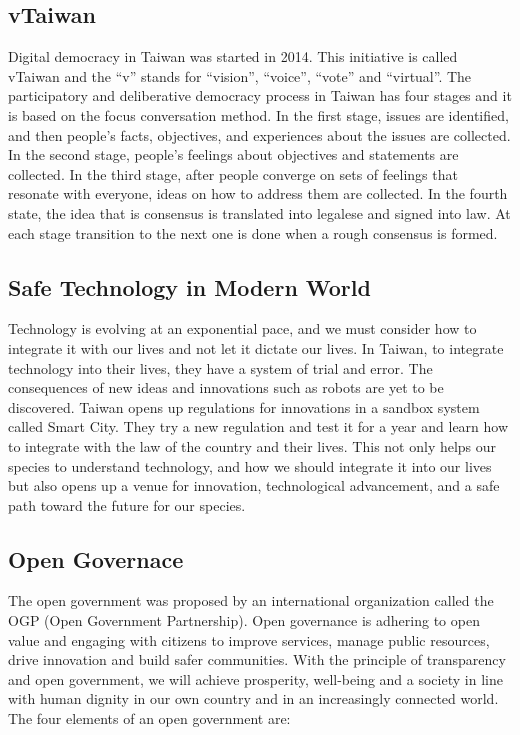 \documentclass{IEEEtran}
\begin{document}
\begin{enumerate}
\subsection{vTaiwan}
Digital democracy in Taiwan was started in 2014. This initiative is called vTaiwan and the “v” stands for “vision”, “voice”, “vote” and “virtual”. The participatory and deliberative democracy process in Taiwan has four stages and it is based on the focus conversation method. In the first stage, issues are identified, and then people’s facts, objectives, and experiences about the issues are collected. In the second stage, people's feelings about objectives and statements are collected. In the third stage, after people converge on sets of feelings that resonate with everyone, ideas on how to address them are collected. In the fourth state, the idea that is consensus is translated into legalese and signed into law. At each stage transition to the next one is done when a rough consensus is formed.

\subsection{Safe Technology in Modern World}
Technology is evolving at an exponential pace, and we must consider how to integrate it with our lives and not let it dictate our lives. In Taiwan, to integrate technology into their lives, they have a system of trial and error. The consequences of new ideas and innovations such as robots are yet to be discovered. Taiwan opens up regulations for innovations in a sandbox system called Smart City. They try a new regulation and test it for a year and learn how to integrate with the law of the country and their lives. This not only helps our species to understand technology, and how we should integrate it into our lives but also opens up a venue for innovation, technological advancement, and a safe path toward the future for our species.

\subsection{Open Governace} 
The open government was proposed by an international organization called the OGP (Open Government Partnership). 
Open governance is adhering to open value and engaging with citizens to improve services, manage public resources, drive innovation and build safer communities. With the principle of transparency and open government, we will achieve prosperity, well-being and a society in line with human dignity in our own country and in an increasingly connected world.
The four elements of an open government are:

\end{enumerate}
\end{document}
